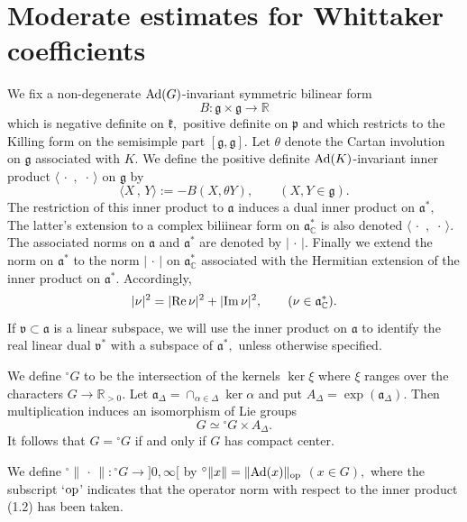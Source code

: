 \documentclass[12pt,a4paper]{article}
\def\qquad{\quad\quad}
\def\msy#1{{\mathbb #1}}
\def\C{{\msy C}}
\def\R{{\msy R}}
\def\ga{\alpha}
\def\gD{\Delta}
\def\got#1{\mathfrak #1}
\def\fa{{\got a}}
\def\fg{{\got g}}
\def\fk{{\got k}}
\def\fp{{\got p}}
\def\to{\rightarrow}
\def\Re{{\rm Re}\,}
\def\Im{{\rm Im}\,}
\def\inp#1#2{\langle#1\,,\,#2\rangle}
\def\Ad{{\rm Ad}}
\numberwithin{Thm}{section}
\numberwithin{equation}{section}
\def\dotvar{\, \cdot\,}
\def\fadc{\fa_\C^*}
\def\Cartan{\theta}
\numberwithin{equation}{section}
\def\fad{{\fa^*}}
\def\Cartan{\theta}
\def\fv{{\mathfrak v}}
\begin{document}
\section{Moderate estimates for Whittaker coefficients}\label{s: moderate estimates}
We fix a non-degenerate $\Ad(G)$-invariant symmetric bilinear form
\begin{equation} 
\label{e: intro of B}
B: \fg \times \fg \to \R
\end{equation}
which is negative definite on $\fk,$ positive definite on $\fp$ and which restricts to the Killing form on the semisimple 
part $[\fg, \fg].$ Let $\theta$ denote the Cartan involution on $\fg$ associated with $K.$ 
We define the positive definite $\Ad(K)$-invariant inner product 
$\inp{\dotvar}{\dotvar}$ on $\fg$ by 
\begin{equation}
\label{e: defi inp}
\inp{X}{Y}:= - B(X, \Cartan Y), \qquad (X,Y\in\fg).
\end{equation}
The restriction of this inner product to $\fa$ induces a dual inner product
on $\fa^*,$ The latter's extension to a complex biliinear form on $\fadc$ is also denoted 
$\inp{\dotvar}{\dotvar}.$  The associated norms on $\fa$ and $\fad$ are denoted by 
$|\dotvar|.$ Finally we extend the norm on $\fad$ to the norm $|\dotvar|$ on $\fadc$ associated with the 
Hermitian extension of the inner product on $\fad.$ Accordingly, 
\begin{equation}
\label{e: defi norm on fadc}
|\nu|^2 = |\Re \nu|^2 + |\Im \nu|^2, \qquad (\nu \in \fadc).
\end{equation}%
If $\fv \subset \fa$ is a linear subspace, we will use the inner product on $\fa$ 
to identify the real linear dual $\fv^*$ with a subspace of $\fa^*,$ unless
otherwise specified.

We define ${}^\circ G$ to be the intersection of the kernels $\ker \xi$ 
where $\xi$ ranges over the characters $G \to \R_{>0}.$ Let 
$\fa_\gD = \cap_{\ga \in \gD} \ker\ga$ and put $A_\gD = \exp (\fa_\gD).$ 
Then multiplication induces an isomorphism of Lie groups
$$ 
G \simeq {}^\circ G \times A_\gD.
$$ 
It follows that $G = {}^\circ G$ if and only if $G$ has compact center.

We define ${}^\circ \|\dotvar\|: {}^\circ G \to ]0,\infty[$ by 
${}^\circ\|x\| = \|\Ad(x)\|_{\rm op}$ $(x \in G),$ 
where the subscript `${\rm op}$' indicates that the operator norm with 
respect to the inner product (1.2) has been taken.
\end{document}

